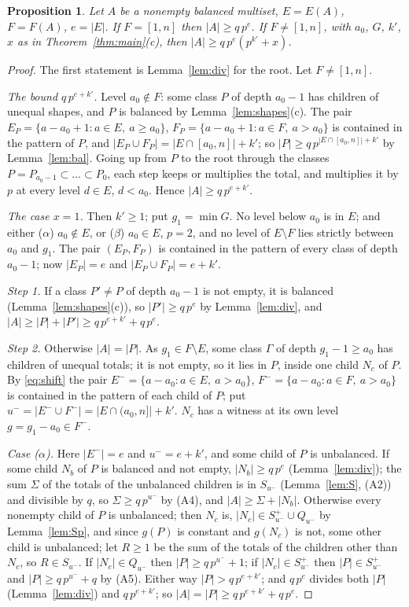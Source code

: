 \documentclass[11pt,a4paper]{amsart}
\newtheorem{proposition}[theorem]{Proposition}
\theoremstyle{definition}
\theoremstyle{remark}
\newcommand{\Sp}{S^{+}}
\begin{document}
\begin{proposition}\label{prop:B}
Let $A$ be a nonempty balanced multiset, $E=E(A)$, $F=F(A)$, $e=|E|$.
If $F=[1,n]$ then $|A|\ge q\,p^{e}$. If $F\ne[1,n]$, with $a_0$, $G$, $k'$, $x$ as in
Theorem~\ref{thm:main}(c), then $|A|\ge q\,p^{e}(p^{k'}+x)$.
\end{proposition}
\begin{proof}
The first statement is Lemma~\ref{lem:div} for the root. Let $F\ne[1,n]$.

\emph{The bound $q\,p^{e+k'}$.} Level $a_0\notin F$: some class $P$ of depth $a_0-1$ has children of unequal
shapes, and $P$ is balanced by Lemma~\ref{lem:shapes}(c). The pair
$E_P=\{a-a_0+1:a\in E,\ a\ge a_0\}$, $F_P=\{a-a_0+1:a\in F,\ a>a_0\}$ is contained in the pattern of $P$, and
$|E_P\cup F_P|=|E\cap[a_0,n]|+k'$; so $|P|\ge q\,p^{|E\cap[a_0,n]|+k'}$ by Lemma~\ref{lem:bal}. Going up from
$P$ to the root through the classes $P=P_{a_0-1}\subset\dots\subset P_0$, each step keeps or multiplies the
total, and multiplies it by $p$ at every level $d\in E$, $d<a_0$. Hence $|A|\ge q\,p^{e+k'}$.

\emph{The case $x=1$.} Then $k'\ge1$; put $g_1=\min G$. No level below $a_0$ is in $E$; and either
($\alpha$) $a_0\notin E$, or ($\beta$) $a_0\in E$, $p=2$, and no level of $E\setminus F$ lies strictly between
$a_0$ and $g_1$. The pair $(E_P,F_P)$ is contained in the pattern of every class of depth $a_0-1$; now
$|E_P|=e$ and $|E_P\cup F_P|=e+k'$.

\emph{Step 1.} If a class $P'\ne P$ of depth $a_0-1$ is not empty, it is balanced
(Lemma~\ref{lem:shapes}(c)), so $|P'|\ge q\,p^e$ by Lemma~\ref{lem:div}, and
$|A|\ge|P|+|P'|\ge q\,p^{e+k'}+q\,p^e$.

\emph{Step 2.} Otherwise $|A|=|P|$. As $g_1\in F\setminus E$, some class $\Gamma$ of depth $g_1-1\ge a_0$ has
children of unequal totals; it is not empty, so it lies in $P$, inside one child $N_c$ of $P$. By
\eqref{eq:shift} the pair $E^-=\{a-a_0:a\in E,\ a>a_0\}$, $F^-=\{a-a_0:a\in F,\ a>a_0\}$ is contained in the
pattern of each child of $P$; put $u^-=|E^-\cup F^-|=|E\cap(a_0,n]|+k'$. $N_c$ has a witness at its own level
$g=g_1-a_0\in F^-$.

\emph{Case ($\alpha$).} Here $|E^-|=e$ and $u^-=e+k'$, and some child of $P$ is unbalanced. If some child
$N_b$ of $P$ is balanced and not empty, $|N_b|\ge q\,p^e$ (Lemma~\ref{lem:div}); the sum $\Sigma$ of the totals
of the unbalanced children is in $S_{u^-}$ (Lemma~\ref{lem:S}, (A2)) and divisible by $q$, so
$\Sigma\ge q\,p^{u^-}$ by (A4), and $|A|\ge\Sigma+|N_b|$. Otherwise every nonempty child of $P$ is unbalanced;
then $N_c$ is, $|N_c|\in\Sp_{u^-}\cup Q_{u^-}$ by Lemma~\ref{lem:Sp}, and since $g(P)$ is constant and
$g(N_c)$ is not, some other child is unbalanced; let $R\ge1$ be the sum of the totals of the children other
than $N_c$, so $R\in S_{u^-}$. If $|N_c|\in Q_{u^-}$ then $|P|\ge q\,p^{u^-}+1$; if $|N_c|\in\Sp_{u^-}$ then
$|P|\in\Sp_{u^-}$ and $|P|\ge q\,p^{u^-}+q$ by (A5). Either way $|P|>q\,p^{e+k'}$; and $q\,p^e$ divides both
$|P|$ (Lemma~\ref{lem:div}) and $q\,p^{e+k'}$; so $|A|=|P|\ge q\,p^{e+k'}+q\,p^e$.


\end{proof}
\end{document}
